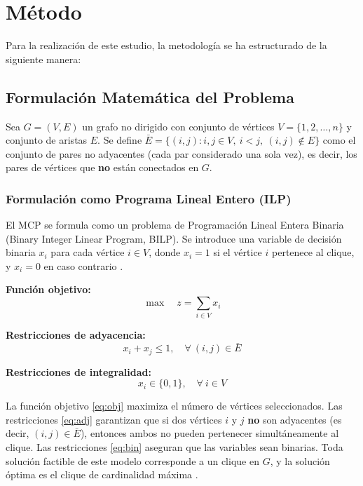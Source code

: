 \section{Método}\label{sec:met}

Para la realización de este estudio, la metodología se ha estructurado de la siguiente manera:

\subsection{Formulación Matemática del Problema}\label{subsec:formulacion}

Sea $G = (V, E)$ un grafo no dirigido con conjunto de vértices $V = \{1, 2, \ldots, n\}$ y conjunto de aristas $E$. Se define $\bar{E} = \{(i,j) : i,j \in V,\ i < j,\ (i,j) \notin E\}$ como el conjunto de pares no adyacentes (cada par considerado una sola vez), es decir, los pares de vértices que \textbf{no} están conectados en $G$.

\subsubsection{Formulación como Programa Lineal Entero (ILP)}

El MCP se formula como un problema de Programación Lineal Entera Binaria (Binary Integer Linear Program, BILP). Se introduce una variable de decisión binaria $x_i$ para cada vértice $i \in V$, donde $x_i = 1$ si el vértice $i$ pertenece al clique, y $x_i = 0$ en caso contrario \parencite{pardalos1994maximum, nemhauser1988}.

\vspace{0.3cm}
\noindent\textbf{Función objetivo:}
\begin{equation}\label{eq:obj}
    \max \quad z = \sum_{i \in V} x_i
\end{equation}

\noindent\textbf{Restricciones de adyacencia:}
\begin{equation}\label{eq:adj}
    x_i + x_j \leq 1, \quad \forall\ (i,j) \in \bar{E}
\end{equation}

\noindent\textbf{Restricciones de integralidad:}
\begin{equation}\label{eq:bin}
    x_i \in \{0, 1\}, \quad \forall\ i \in V
\end{equation}

La función objetivo \eqref{eq:obj} maximiza el número de vértices seleccionados. Las restricciones \eqref{eq:adj} garantizan que si dos vértices $i$ y $j$ \textbf{no} son adyacentes (es decir, $(i,j) \in \bar{E}$), entonces ambos no pueden pertenecer simultáneamente al clique. Las restricciones \eqref{eq:bin} aseguran que las variables sean binarias. Toda solución factible de este modelo corresponde a un clique en $G$, y la solución óptima es el clique de cardinalidad máxima \parencite{pardalos1994maximum, bomze1999}.

